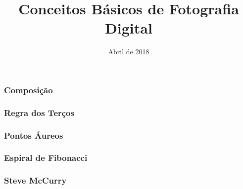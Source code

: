 


\title{Conceitos Básicos de Fotografia Digital}
\author{}
\date{Abril de 2018}



\coverframe

\begin{frame}
    \frametitle{Composição}
\end{frame}

\begin{frame}
    \frametitle{Regra dos Terços}
\end{frame}

\begin{frame}
    \frametitle{Pontos Áureos}
\end{frame}

\begin{frame}
    \frametitle{Espiral de Fibonacci}
\end{frame}

\begin{frame}
    \frametitle{Steve McCurry}
\end{frame}



